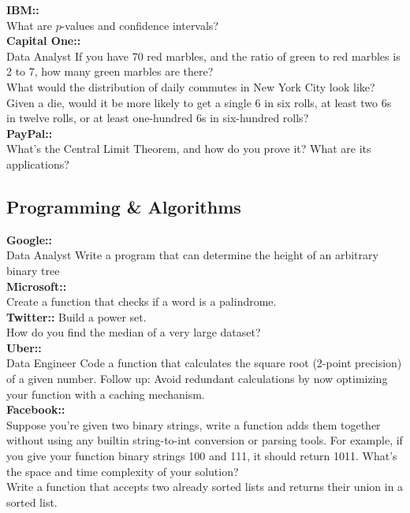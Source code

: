 \documentclass[11pt]{article}
\begin{document}
{\bf IBM:: }\\
What are $p$-values and confidence intervals?\\

{\bf Capital One:: }\\
Data Analyst If you have 70 red marbles, and the ratio of green to red marbles is 2 to 7, how many green marbles are there?\\
What would the distribution of daily commutes in New York City look like?\\
Given a die, would it be more likely to get a single 6 in six rolls, at least two 6s in twelve rolls, or at least one-hundred 6s in six-hundred rolls?\\

{\bf PayPal:: }\\
What’s the Central Limit Theorem, and how do you prove it? What are its applications?\\


\subsection{Programming \& Algorithms}
{\bf Google:: }\\
Data Analyst Write a program that can determine the height of an arbitrary binary tree\\

{\bf Microsoft:: }\\
Create a function that checks if a word is a palindrome. \\

{\bf Twitter:: }
Build a power set.\\
How do you find the median of a very large dataset?\\

{\bf Uber:: }\\
Data Engineer Code a function that calculates the square root (2-point precision) of a given number. Follow up: Avoid redundant calculations by now optimizing your function with a caching mechanism. \\

{\bf Facebook:: }\\
Suppose you’re given two binary strings, write a function adds them together without using any builtin string-to-int conversion or parsing tools. For example, if you give your function binary strings 100 and 111, it should return 1011. What’s the space and time complexity of your solution? \\
Write a function that accepts two already sorted lists and returns their union in a sorted list.\\
\end{document}

